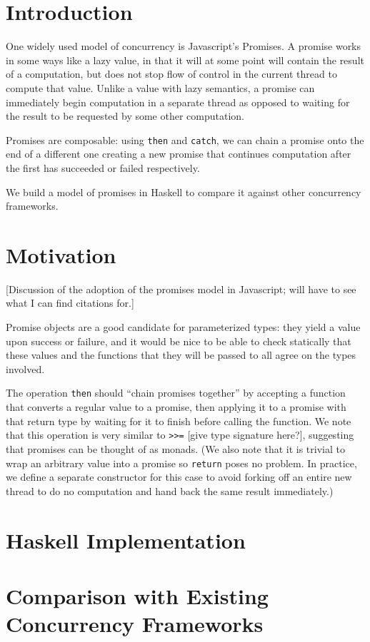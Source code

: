 \documentclass[sigplan,screen,review]{acmart}
\begin{document}
\section{Introduction}
One widely used model of concurrency is Javascript's Promises.  A promise works in some ways like a lazy value, in that it will at some point will contain the result of a computation, but does not stop flow of control in the current thread to compute that value.  Unlike a value with lazy semantics, a promise can immediately begin computation in a separate thread as opposed to waiting for the result to be requested by some other computation.

Promises are composable: using \lstinline{then} and \lstinline{catch}, we can chain a promise onto the end of a different one creating a new promise that continues computation after the first has succeeded or failed respectively.

We build a model of promises in Haskell to compare it against other concurrency frameworks.
\section{Motivation}
[Discussion of the adoption of the promises model in Javascript; will have to see what I can find citations for.]

Promise objects are a good candidate for parameterized types: they yield a value upon success or failure, and it would be nice to be able to check statically that these values and the functions that they will be passed to all agree on the types involved.

The operation \lstinline{then} should ``chain promises together'' by accepting a function that converts a regular value to a promise, then applying it to a promise with that return type by waiting for it to finish before calling the function.  We note that this operation is very similar to \lstinline{>>=} [give type signature here?], suggesting that promises can be thought of as monads.  (We also note that it is trivial to wrap an arbitrary value into a promise so \lstinline{return} poses no problem.  In practice, we define a separate constructor for this case to avoid forking off an entire new thread to do no computation and hand back the same result immediately.)
\section{Haskell Implementation}

\section{Comparison with Existing Concurrency Frameworks}
\end{document}
